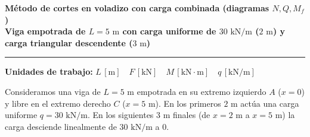 \begin{tcolorbox}[colback=blue!3!white, colframe=blue!40!black, arc=3pt, boxrule=0.8pt, left=8pt, right=8pt, top=6pt, bottom=6pt]

    \centering

    {\Large\bfseries\color{blue!60!black} Método de cortes en voladizo con carga combinada (diagramas $N, Q, M_f$)}\\[2pt]

    {\normalsize\bfseries Viga empotrada de $L = 5\text{ m}$ con carga uniforme de $30\text{ kN/m}$ ($2\text{ m}$) y carga triangular descendente ($3\text{ m}$)}



    \vspace{4pt}\hrule\vspace{4pt}

    {\small\textbf{Unidades de trabajo:} $L\,[\text{m}] \quad F\,[\text{kN}] \quad M\,[\text{kN}\cdot\text{m}] \quad q\,[\text{kN/m}]$}

\end{tcolorbox}






Consideramos una viga de $L = 5\text{ m}$ empotrada en su extremo izquierdo $A$ ($x=0$) y libre en el extremo derecho $C$ ($x=5\text{ m}$). En los primeros $2\text{ m}$ actúa una carga uniforme $q = 30\text{ kN/m}$. En los siguientes $3\text{ m}$ finales (de $x=2\text{ m}$ a $x=5\text{ m}$) la carga desciende linealmente de $30\text{ kN/m}$ a $0$.



